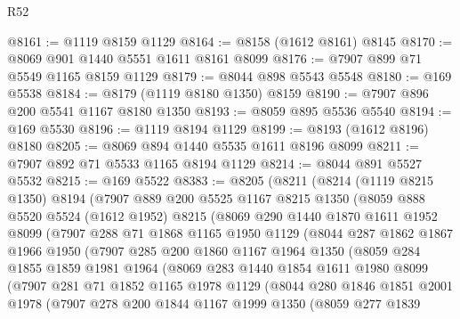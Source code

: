 \begin{lexlean}{R52}
\begin{coremodule}
@8161 := @1119 @8159 @1129
@8164 := @8158 (@1612 @8161) @8145
@8170 := @8069 @901 @1440 @5551 @1611 @8161 @8099
@8176 := @7907 @899 @71 @5549 @1165 @8159 @1129
@8179 := @8044 @898 @5543 @5548
@8180 := @169 @5538
@8184 := @8179 (@1119 @8180 @1350) @8159
@8190 := @7907 @896 @200 @5541 @1167 @8180 @1350
@8193 := @8059 @895 @5536 @5540
@8194 := @169 @5530
@8196 := @1119 @8194 @1129
@8199 := @8193 (@1612 @8196) @8180
@8205 := @8069 @894 @1440 @5535 @1611 @8196 @8099
@8211 := @7907 @892 @71 @5533 @1165 @8194 @1129
@8214 := @8044 @891 @5527 @5532
@8215 := @169 @5522
@8383 := @8205
    (@8211
      (@8214
        (@1119 @8215 @1350)
        @8194
        (@7907
          @889
          @200
          @5525
          @1167
          @8215
          @1350
          (@8059
            @888
            @5520
            @5524
            (@1612 @1952)
            @8215
            (@8069
              @290
              @1440
              @1870
              @1611
              @1952
              @8099
              (@7907
                @288
                @71
                @1868
                @1165
                @1950
                @1129
                (@8044
                  @287
                  @1862
                  @1867
                  @1966
                  @1950
                  (@7907
                    @285
                    @200
                    @1860
                    @1167
                    @1964
                    @1350
                    (@8059
                      @284
                      @1855
                      @1859
                      @1981
                      @1964
                      (@8069
                        @283
                        @1440
                        @1854
                        @1611
                        @1980
                        @8099
                        (@7907
                          @281
                          @71
                          @1852
                          @1165
                          @1978
                          @1129
                          (@8044
                            @280
                            @1846
                            @1851
                            @2001
                            @1978
                            (@7907
                              @278
                              @200
                              @1844
                              @1167
                              @1999
                              @1350
                              (@8059
                                @277
                                @1839

\end{coremodule}
\end{lexlean}
